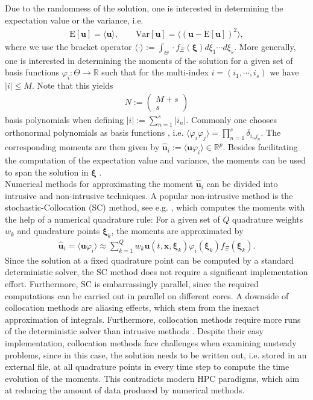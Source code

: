 Due to the randomness of the solution, one is interested in determining the expectation value or the variance, i.e.
\begin{align*}
\text{E}[\bm{u}] = \langle \bm{u} \rangle,\qquad \text{Var}[\bm{u}] = \langle \left( \bm{u}-\text{E}[\bm{u}]\right)^2\rangle,
\end{align*}
where we use the bracket operator $\langle \cdot \rangle := \int_{\Theta} \cdot f_{\Xi}(\bm\xi)d\xi_1 \cdots d\xi_s$. More generally, one is interested in determining the moments of the solution for a given set of basis functions $\varphi_{i}:\Theta\to\mathbb{R}$ such that for the multi-index $i = (i_1,\cdots,i_s)$ we have $|i| \leq M$. Note that this yields
\begin{align*}
N:=\begin{pmatrix}
M+s \\ s
\end{pmatrix}
\end{align*}
basis polynomials when defining $|i|:=\sum_{n = 1}^s |i_n|$. Commonly one chooses orthonormal polynomials as basis functions \cite{xiu2002wiener}, i.e. $\langle \varphi_i \varphi_j \rangle =\prod_{n=1}^s\delta_{i_nj_n}$.  The corresponding moments are then given by $\bm{\hat u}_i := \langle \bm{u}\varphi_i \rangle\in\mathbb{R}^p$. Besides facilitating the computation of the expectation value and variance, the moments can be used to span the solution in $\bm\xi$ \cite{wiener1938homogeneous}. \\

Numerical methods for approximating the moment $\bm{\hat u}_i$ can be divided into intrusive and non-intrusive techniques. A popular non-intrusive method is the stochastic-Collocation (SC) method, see e.g. \cite{xiu2005high,babuvska2007stochastic,loeven2008probabilistic}, which computes the moments with the help of a numerical quadrature rule: For a given set of $Q$ quadrature weights $w_k$ and quadrature points $\bm{\xi}_k$, the moments are approximated by
\begin{align*}
\bm{\hat u}_i = \langle \bm{u}\varphi_i \rangle \approx \sum_{k = 1}^{Q}w_k \bm{u}({t,\bm{x},\bm{\xi}_k})\varphi_i(\bm{\xi}_k)f_{\Xi}(\bm{\xi}_k).
\end{align*} 
Since the solution at a fixed quadrature point can be computed by a standard deterministic solver, the SC method does not require a significant implementation effort. Furthermore, SC is embarrassingly parallel, since the required computations can be carried out in parallel on different cores. A downside of collocation methods are aliasing effects, which stem from the inexact approximation of integrals. Furthermore, collocation methods require more runs of the deterministic solver than intrusive methods \cite{xiu2009fast,alekseev2011estimation}. Despite their easy implementation, collocation methods face challenges when examining unsteady problems, since in this case, the solution needs to be written out, i.e. stored in an external file, at all quadrature points in every time step to compute the time evolution of the moments. This contradicts modern HPC paradigms, which aim at reducing the amount of data produced by numerical methods.

